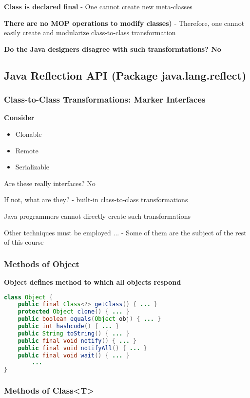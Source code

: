 \textbf{Class is declared final}
	- One cannot create new meta-classes
	
\textbf{There are no MOP operations to modify classes)}
	- Therefore, one cannot easily create and modularize class-to-class transformation
	
\textbf{Do the Java designers disagree with such transformtations? No}

\subsection{Java Reflection API (Package java.lang.reflect)}

\subsubsection{Class-to-Class Transformations: Marker Interfaces}

\textbf{Consider}
\begin{itemize}
	\item Clonable 
	\item Remote
	\item Serializable
\end{itemize}

Are these really interfaces? No

If not, what are they?
	- built-in class-to-class transformations

Java programmers cannot directly create such transformations

Other techniques must be employed ...
	- Some of them are the subject of the rest of this course

\subsubsection{Methods of Object}

\textbf{Object defines method to which all objects respond}

\begin{lstlisting}[language=Java]
class Object {
	public final Class<?> getClass() { ... }
	protected Object clone() { ... }
	public boolean equals(Object obj) { ... }
	public int hashcode() { ... }
	public String toString() { ... }
	public final void notify() { ... }
	public final void notifyAll() { ... }
	public final void wait() { ... }
		...
}
\end{lstlisting}

\subsubsection{Methods of Class<T>}

